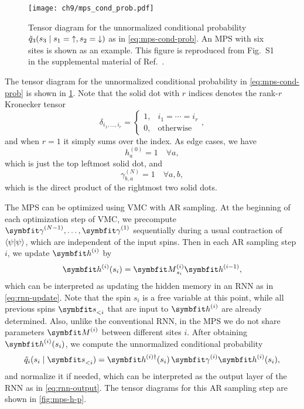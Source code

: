 \begin{figure}[htb]
\centering
\texttt{[image: ch9/mps\_cond\_prob.pdf]}
\caption[Tensor diagram for conditional probability in MPS]{
Tensor diagram for the unnormalized conditional probability $\tilde{q}_3(s_3 \mid s_1 = {\uparrow}, s_2 = {\downarrow})$ as in \cref{eq:mps-cond-prob}. An MPS with six sites is shown as an example.
This figure is reproduced from Fig.~S1 in the supplemental material of Ref.~\cite{wu2023tensor}.
}
\label{fig:mps-cond-prob}
\end{figure}

The tensor diagram for the unnormalized conditional probability in \cref{eq:mps-cond-prob} is shown in \cref{fig:mps-cond-prob}. Note that the solid dot with $r$ indices denotes the rank-$r$ Kronecker tensor
\begin{equation}
\delta_{i_1, \ldots, i_r} = \begin{cases}
1, & i_1 = \cdots = i_r \\
0, & \text{otherwise}
\end{cases},
\end{equation}
and when $r = 1$ it simply sums over the index. As edge cases, we have
\begin{equation}
h^{(0)}_a = 1 \quad \forall a,
\end{equation}
which is just the top leftmost solid dot, and
\begin{equation}
\gamma^{(N)}_{b, a} = 1 \quad \forall a, b,
\end{equation}
which is the direct product of the rightmost two solid dots.

The MPS can be optimized using VMC with AR sampling. At the beginning of each optimization step of VMC, we precompute $\mga^{(N - 1)}, \ldots, \mga^{(1)}$ sequentially during a usual contraction of $\ip{\psi}$, which are independent of the input spins. Then in each AR sampling step $i$, we update $\vh^{(i)}$ by
\begin{equation}
\vh^{(i)}(s_i) = \mM^{(i)}_{s_i} \vh^{(i - 1)},
\label{eq:mps-rnn-h}
\end{equation}
which can be interpreted as updating the hidden memory in an RNN as in \cref{eq:rnn-update}. Note that the spin $s_i$ is a free variable at this point, while all previous spins $\vs_{< i}$ that are input to $\vh^{(i)}$ are already determined. Also, unlike the conventional RNN, in the MPS we do not share parameters $\mM^{(i)}$ between different sites $i$. After obtaining $\vh^{(i)}(s_i)$, we compute the unnormalized conditional probability
\begin{equation}
\tilde{q}_i(s_i \mid \vs_{< i}) = \vh^{(i) \dagger}(s_i)\,\mga^{(i)} \vh^{(i)}(s_i),
\label{eq:mps-rnn-q}
\end{equation}
and normalize it if needed, which can be interpreted as the output layer of the RNN as in \cref{eq:rnn-output}. The tensor diagrams for this AR sampling step are shown in \cref{fig:mps-h-p}.

